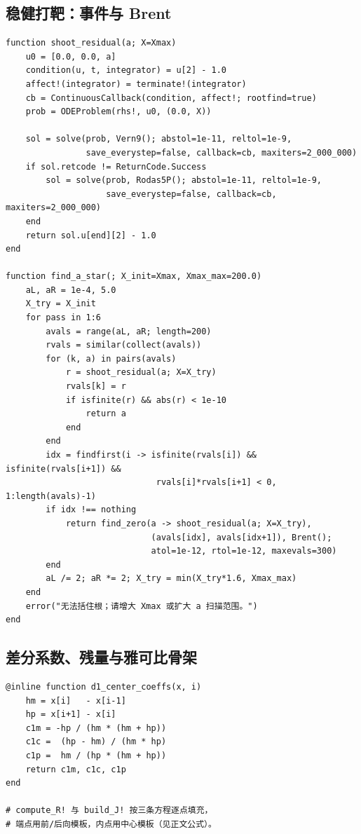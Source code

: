 \documentclass[12pt]{article}
\begin{document}
\subsection*{稳健打靶：事件与 Brent}
\begin{lstlisting}
function shoot_residual(a; X=Xmax)
    u0 = [0.0, 0.0, a]
    condition(u, t, integrator) = u[2] - 1.0
    affect!(integrator) = terminate!(integrator)
    cb = ContinuousCallback(condition, affect!; rootfind=true)
    prob = ODEProblem(rhs!, u0, (0.0, X))

    sol = solve(prob, Vern9(); abstol=1e-11, reltol=1e-9,
                save_everystep=false, callback=cb, maxiters=2_000_000)
    if sol.retcode != ReturnCode.Success
        sol = solve(prob, Rodas5P(); abstol=1e-11, reltol=1e-9,
                    save_everystep=false, callback=cb, maxiters=2_000_000)
    end
    return sol.u[end][2] - 1.0
end

function find_a_star(; X_init=Xmax, Xmax_max=200.0)
    aL, aR = 1e-4, 5.0
    X_try = X_init
    for pass in 1:6
        avals = range(aL, aR; length=200)
        rvals = similar(collect(avals))
        for (k, a) in pairs(avals)
            r = shoot_residual(a; X=X_try)
            rvals[k] = r
            if isfinite(r) && abs(r) < 1e-10
                return a
            end
        end
        idx = findfirst(i -> isfinite(rvals[i]) && isfinite(rvals[i+1]) &&
                              rvals[i]*rvals[i+1] < 0, 1:length(avals)-1)
        if idx !== nothing
            return find_zero(a -> shoot_residual(a; X=X_try),
                             (avals[idx], avals[idx+1]), Brent();
                             atol=1e-12, rtol=1e-12, maxevals=300)
        end
        aL /= 2; aR *= 2; X_try = min(X_try*1.6, Xmax_max)
    end
    error("无法括住根；请增大 Xmax 或扩大 a 扫描范围。")
end
\end{lstlisting}

\subsection*{差分系数、残量与雅可比骨架}
\begin{lstlisting}
@inline function d1_center_coeffs(x, i)
    hm = x[i]   - x[i-1]
    hp = x[i+1] - x[i]
    c1m = -hp / (hm * (hm + hp))
    c1c =  (hp - hm) / (hm * hp)
    c1p =  hm / (hp * (hm + hp))
    return c1m, c1c, c1p
end

# compute_R! 与 build_J! 按三条方程逐点填充，
# 端点用前/后向模板，内点用中心模板（见正文公式）。
\end{lstlisting}
\end{document}
